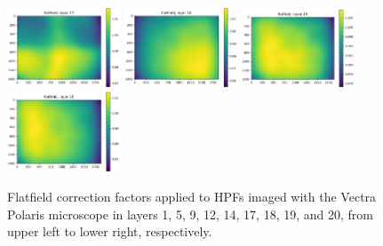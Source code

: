 \documentclass[letterpaper,11pt]{article}
\begin{document}
\begin{figure}[!ht]
\includegraphics[width=0.3\textwidth]{images/methods/flatfield_layers_polaris/flatfield_layer_17}
\includegraphics[width=0.3\textwidth]{images/methods/flatfield_layers_polaris/flatfield_layer_18}
\includegraphics[width=0.3\textwidth]{images/methods/flatfield_layers_polaris/flatfield_layer_19}
\includegraphics[width=0.3\textwidth]{images/methods/flatfield_layers_polaris/flatfield_layer_20}
\caption{\footnotesize Flatfield correction factors applied to HPFs imaged with the Vectra Polaris microscope in layers 1, 5, 9, 12, 14, 17, 18, 19, and 20, from upper left to lower right, respectively.}
\label{fig:applied_flatfield_layers_polaris_1}
\end{figure}
\end{document}
